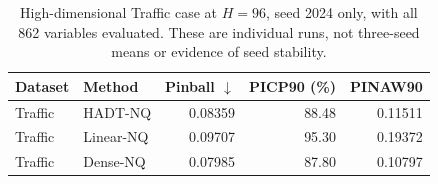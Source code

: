 \begin{table}[t]
\caption{High-dimensional Traffic case at $H=96$, seed 2024 only, with all 862 variables evaluated. These are individual runs, not three-seed means or evidence of seed stability.}
\label{tab:traffic}
\centering
\small
\begin{tabular}{@{}llrrr@{}}
\toprule
Dataset & Method & Pinball $\downarrow$ & PICP90 (\%) & PINAW90 \\
\midrule
Traffic & HADT-NQ & 0.08359 & 88.48 & 0.11511 \\
Traffic & Linear-NQ & 0.09707 & 95.30 & 0.19372 \\
Traffic & Dense-NQ & 0.07985 & 87.80 & 0.10797 \\
\bottomrule
\end{tabular}
\end{table}

